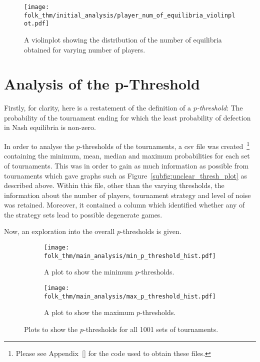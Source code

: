 \begin{figure}      
    \centering
    \texttt{[image: folk\_thm/initial\_analysis/player\_num\_of\_equilibria\_violinplot.pdf]}
    \caption{A violinplot showing the distribution of the number of equilibria obtained for varying number of players.}\label{fig:NE_violinplot}
\end{figure}



\section{Analysis of the p-Threshold}\label{sec:Analysis_of_the_p-Threshold}

Firstly, for clarity, here is a restatement of the definition of a
\textit{\(p\)-threshold}: The probability of the tournament ending for which the
least probability of defection in Nash equilibria is non-zero.

In order to analyse the \(p\)-thresholds of the tournaments, a csv file was created~\footnote{Please see Appendix~\ref{} %
for the code used to obtain these files.} containing the
minimum, mean, median and maximum probabilities for each set of tournaments.
This was in order to gain as much information as possible from tournaments which
gave graphs such as Figure~\ref{subfig:unclear_thresh_plot} as described above. 
Within this file, other than the varying thresholds, the
information about the number of players, tournament strategy and level of
noise was retained. Moreover, it contained a column which identified whether any
of the strategy sets lead to possible degenerate games.

Now, an exploration into the overall \(p\)-thresholds is given.

\begin{figure}
    \begin{subfigure}{.45\textwidth}
        \centering
        \texttt{[image: folk\_thm/main\_analysis/min\_p\_threshold\_hist.pdf]}
        \caption{A plot to show the minimum \(p\)-thresholds.}\label{subfig:min_p_thresh}
    \end{subfigure}
    \begin{subfigure}{.45\textwidth}
        \centering
        \texttt{[image: folk\_thm/main\_analysis/max\_p\_threshold\_hist.pdf]}
        \caption{A plot to show the maximum \(p\)-thresholds.}\label{subfig:max_p_thresh}
    \end{subfigure}
    \caption{Plots to show the \(p\)-thresholds for all 1001 sets of tournaments.}\label{fig:min_max_p_thresh}
\end{figure}

